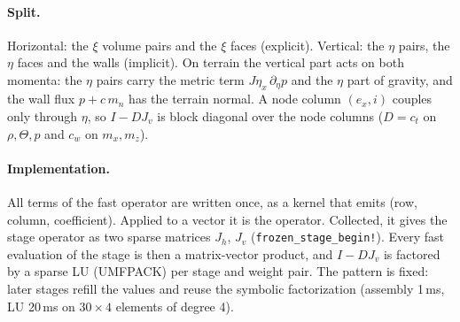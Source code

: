 \documentclass[11pt,a4paper]{article}
\newcommand{\code}[1]{\texttt{#1}}
\begin{document}
\paragraph{Split.} Horizontal: the $\xi$ volume pairs and the $\xi$ faces (explicit). Vertical: the $\eta$ pairs, the
$\eta$ faces and the walls (implicit). On terrain the vertical part acts on both momenta: the
$\eta$ pairs carry the metric term $J\eta_x\,\partial_\eta p$ and the $\eta$ part of gravity, and the wall flux
$p+c\,m_n$ has the terrain normal. A node column $(e_x,i)$ couples only through $\eta$, so $I-DJ_v$ is block
diagonal over the node columns ($D=c_t$ on $\rho,\Theta,p$ and $c_w$ on $m_x,m_z$).

\paragraph{Implementation.} All terms of the fast operator are written once, as a kernel that emits
(row, column, coefficient). Applied to a vector it is the operator. Collected, it gives the stage operator as two
sparse matrices $J_h$, $J_v$ (\code{frozen\_stage\_begin!}). Every fast evaluation of the stage is then a
matrix-vector product, and $I-DJ_v$ is factored by a sparse LU (UMFPACK) per stage and weight pair. The
pattern is fixed: later stages refill the values and reuse the symbolic factorization (assembly 1\,ms, LU
20\,ms on $30\times4$ elements of degree 4).
\end{document}
